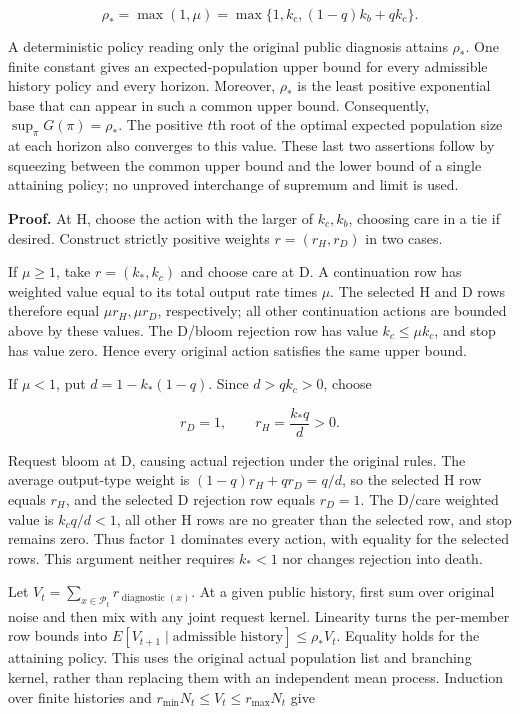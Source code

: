 \documentclass[
  english,
  11pt,
  oneside]{book}
\begin{document}
\[\boxed{\rho_*=\max(1,\mu)=\max\{1,k_c,(1-q)k_b+qk_c\}.}\]

A deterministic policy reading only the original public diagnosis attains \(\rho_*\). One finite constant gives an expected-population upper bound for every admissible history policy and every horizon. Moreover, \(\rho_*\) is the least positive exponential base that can appear in such a common upper bound. Consequently, \(\sup_\pi G(\pi)=\rho_*\). The positive \(t\)th root of the optimal expected population size at each horizon also converges to this value. These last two assertions follow by squeezing between the common upper bound and the lower bound of a single attaining policy; no unproved interchange of supremum and limit is used.

\textbf{Proof.} At H, choose the action with the larger of \(k_c,k_b\), choosing care in a tie if desired. Construct strictly positive weights \(r=(r_H,r_D)\) in two cases.

If \(\mu\ge1\), take \(r=(k_*,k_c)\) and choose care at D. A continuation row has weighted value equal to its total output rate times \(\mu\). The selected H and D rows therefore equal \(\mu r_H,\mu r_D\), respectively; all other continuation actions are bounded above by these values. The D/bloom rejection row has value \(k_c\le\mu k_c\), and stop has value zero. Hence every original action satisfies the same upper bound.

If \(\mu<1\), put \(d=1-k_*(1-q)\). Since \(d>qk_c>0\), choose

\[r_D=1,\qquad r_H=\frac{k_*q}{d}>0.\]

Request bloom at D, causing actual rejection under the original rules. The average output-type weight is \((1-q)r_H+qr_D=q/d\), so the selected H row equals \(r_H\), and the selected D rejection row equals \(r_D=1\). The D/care weighted value is \(k_cq/d<1\), all other H rows are no greater than the selected row, and stop remains zero. Thus factor \(1\) dominates every action, with equality for the selected rows. This argument neither requires \(k_*<1\) nor changes rejection into death.

Let \(V_t=\sum_{x\in\mathcal P_t}r_{\operatorname{diagnostic}(x)}\). At a given public history, first sum over original noise and then mix with any joint request kernel. Linearity turns the per-member row bounds into \(E[V_{t+1}\mid\text{admissible history}]\le\rho_*V_t\). Equality holds for the attaining policy. This uses the original actual population list and branching kernel, rather than replacing them with an independent mean process. Induction over finite histories and \(r_{\min}N_t\le V_t\le r_{\max}N_t\) give
\end{document}
